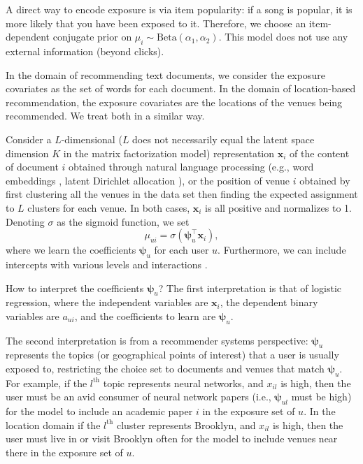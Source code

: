  A direct way to encode exposure is via item
popularity: if a song is popular, it is more likely that you have been
exposed to it. Therefore, we choose an item-dependent conjugate prior on
$\mu_i \sim \mathrm{Beta}(\alpha_1, \alpha_2)$. This model does not use
any external information (beyond clicks). 

In the domain of recommending text documents, 
we consider the exposure covariates as the set of words 
for each document. 
In the domain of location-based recommendation, 
the exposure covariates are the locations of the venues being recommended. 
We treat both in a similar way. 

Consider a $L$-dimensional ($L$ does not necessarily equal the latent space dimension $K$ in the matrix factorization model) representation $\mathbf{x}_i$ 
of the content of document $i$ 
obtained through natural language processing (e.g., word embeddings \cite{mikolov2013distributed}, latent Dirichlet allocation \cite{blei2003latent}), 
or the position of venue $i$ obtained by first clustering all the venues in the data set 
then finding the expected assignment to $L$ clusters 
for each venue. 
In both cases, $\mathbf{x}_i$ is all positive and normalizes to 1. 
Denoting $\sigma$ as the sigmoid function, 
we set
\begin{equation}
	\mu_{ui} = \sigma(\boldsymbol\psi_u^\top \mathbf{x}_i), 
\end{equation}
where we learn the coefficients $\boldsymbol\psi_u$ 
for each user $u$. Furthermore, we can include intercepts with various levels and interactions \cite{gelman2006data}. 

How to interpret the coefficients $\boldsymbol\psi_u$? 
The first interpretation is that of logistic regression, 
where the independent variables are $\mathbf{x}_i$, 
the dependent binary variables are $a_{ui}$, 
and the coefficients to learn are $\boldsymbol\psi_u$. 

The second interpretation is from a recommender systems perspective: 
$\boldsymbol\psi_u$ represents the topics (or geographical points of interest) that a user is usually exposed to, 
restricting the choice set to documents and venues that match $\boldsymbol\psi_u$. 
For example, if the $l^\mathrm{th}$ topic represents neural networks, 
and $x_{il}$ is high, 
then the user must be an avid consumer of neural network papers 
(i.e., $\boldsymbol\psi_{ul}$ must be high) 
for the model to include an academic paper $i$ in the exposure set of $u$.
In the location domain if the $l^\mathrm{th}$ cluster represents Brooklyn, 
and $x_{il}$ is high, 
then the user must live in or visit Brooklyn often 
for the model to include venues near there in the exposure set of $u$. 


